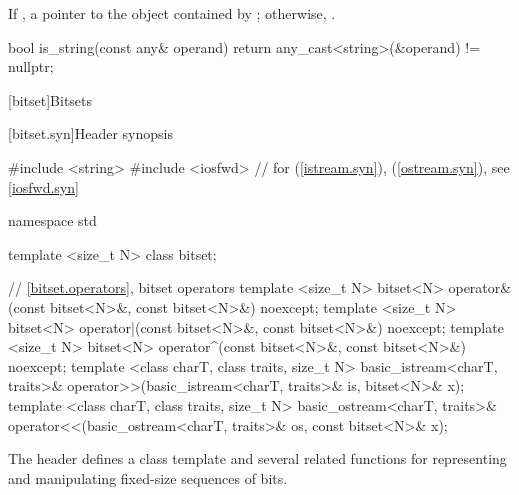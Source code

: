 \begin{itemdescr}
\pnum
\returns
If ,
a pointer to the object contained by ;
otherwise, .

\pnum
\begin{example}
\begin{codeblock}
bool is_string(const any& operand) {
  return any_cast<string>(&operand) != nullptr;
}
\end{codeblock}
\end{example}
\end{itemdescr}

[bitset]{Bitsets}
%

[bitset.syn]{Header  synopsis}%

%
%

\begin{codeblock}
#include <string>
#include <iosfwd>   // for  (\ref{istream.syn}),  (\ref{ostream.syn}), see \ref{iosfwd.syn}

namespace std {
  template <size_t N> class bitset;

  // \ref{bitset.operators}, bitset operators
  template <size_t N>
    bitset<N> operator&(const bitset<N>&, const bitset<N>&) noexcept;
  template <size_t N>
    bitset<N> operator|(const bitset<N>&, const bitset<N>&) noexcept;
  template <size_t N>
    bitset<N> operator^(const bitset<N>&, const bitset<N>&) noexcept;
  template <class charT, class traits, size_t N>
    basic_istream<charT, traits>&
      operator>>(basic_istream<charT, traits>& is, bitset<N>& x);
  template <class charT, class traits, size_t N>
    basic_ostream<charT, traits>&
      operator<<(basic_ostream<charT, traits>& os, const bitset<N>& x);
}
\end{codeblock}

\pnum
The header
defines a
class template
and several related functions for representing
and manipulating fixed-size sequences of bits.

